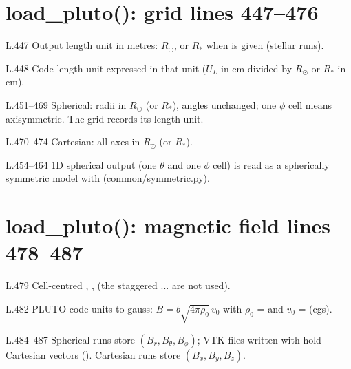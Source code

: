 \section*{\normalsize load\_pluto(): grid \hfill{\small\mdseries\color{gray}lines 447--476}}

\begin{lines}
\item[L.447] Output length unit in metres: $R_\odot$, or $R_\ast$ when  is given (stellar runs).
\item[L.448] Code length unit expressed in that unit ($U_L$ in cm divided by $R_\odot$ or $R_\ast$ in cm).
\item[L.451–469] Spherical: radii in $R_\odot$ (or $R_\ast$), angles unchanged; one $\phi$ cell means axisymmetric. The grid records its length unit.
\item[L.470–474] Cartesian: all axes in $R_\odot$ (or $R_\ast$).
\item[L.454–464] 1D spherical output (one $\theta$ and one $\phi$ cell) is read as a spherically symmetric model with  (common/symmetric.py).
\end{lines}
\section*{\normalsize load\_pluto(): magnetic field \hfill{\small\mdseries\color{gray}lines 478--487}}

\begin{lines}
\item[L.479] Cell-centred , ,  (the staggered ... are not used).
\item[L.482] PLUTO code units to gauss: $B=b\sqrt{4\pi\rho_0}\,v_0$ with $\rho_0$ =  and $v_0$ =  (cgs).
\item[L.484–487] Spherical runs store $(B_r,B_\theta,B_\phi)$; VTK files written with  hold Cartesian vectors (). Cartesian runs store $(B_x,B_y,B_z)$.
\end{lines}
